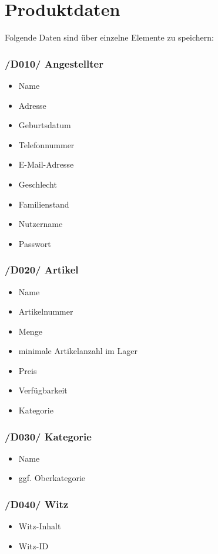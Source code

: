 \documentclass[pdftex,12pt,a4paper]{article}
\begin{document}
\section{Produktdaten}
Folgende Daten sind \"uber einzelne Elemente zu speichern:
\subsubsection*{/D010/ Angestellter}
\begin{itemize}
\item Name
\item Adresse
\item Geburtsdatum
\item Telefonnummer
\item E-Mail-Adresse
\item Geschlecht
\item Familienstand
\item Nutzername
\item Passwort
\end{itemize}
\subsubsection*{/D020/ Artikel}
\begin{itemize}
\item Name
\item Artikelnummer
\item Menge
\item minimale Artikelanzahl im Lager
\item Preis
\item Verf\"ugbarkeit
\item Kategorie
\end{itemize}
\subsubsection*{/D030/ Kategorie}
\begin{itemize}
\item Name
\item ggf. Oberkategorie
\end{itemize}
\subsubsection*{/D040/ Witz}
\begin{itemize}
\item Witz-Inhalt
\item Witz-ID
\end{itemize}
\end{document}
